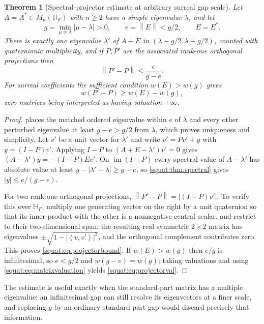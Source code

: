 \documentclass[11pt,letterpaper]{article}
\numberwithin{equation}{section}
\newtheorem{theorem}{Theorem}[section]
\theoremstyle{definition}
\theoremstyle{remark}
\newcommand{\HF}{\mathbb H_F}
\newcommand{\abs}[1]{\left|#1\right|}
\newcommand{\norm}[1]{\left\|#1\right\|}
\newcommand{\angles}[1]{\left\langle#1\right\rangle}
\begin{document}
\begin{theorem}[Spectral-projector estimate at arbitrary surreal gap scale]
\label{squat:thm:projector}
Let $A=A^*\in M_n(\HF)$ with $n\ge2$ have a simple eigenvalue $\lambda$, and let
\[
 g=\min_{\mu\ne\lambda}\abs{\mu-\lambda}>0,\qquad e=\norm E<g/2,\qquad E=E^* .
\]
There is exactly one eigenvalue $\lambda'$ of $A+E$ in $(\lambda-g/2,\lambda+g/2)$,
counted with quaternionic multiplicity, and if $P,P'$ are the associated rank-one
orthogonal projections then
\begin{equation}\label{squat:eq:projectorbound}
 \norm{P'-P}\le\frac{e}{g-e}.
\end{equation}
For surreal coefficients the sufficient condition $w(E)>w(g)$ gives
\begin{equation}\label{squat:eq:projectorval}
 w(P'-P)\ge w(E)-w(g),
\end{equation}
zero matrices being interpreted as having valuation $+\infty$.
\end{theorem}
\begin{proof}
 places the matched ordered eigenvalue within $e$ of $\lambda$ and
every other perturbed eigenvalue at least $g-e>g/2$ from $\lambda$, which proves
uniqueness and simplicity. Let $v'$ be a unit vector for $\lambda'$ and write
$v'=Pv'+y$ with $y=(I-P)v'$. Applying $I-P$ to $(A+E-\lambda')v'=0$ gives
$(A-\lambda')y=-(I-P)Ev'$. On $\operatorname{im}(I-P)$ every spectral value of
$A-\lambda'$ has absolute value at least $g-\abs{\lambda'-\lambda}\ge g-e$, so
\cref{squat:thm:spectral} gives $\abs y\le e/(g-e)$.

For two rank-one orthogonal projections, $\norm{P'-P}=\abs{(I-P)v'}$. To verify this over
$\HF$, multiply one generating vector on the right by a unit quaternion so that its inner
product with the other is a nonnegative central scalar, and restrict to their
two-dimensional span; the resulting real symmetric $2\times2$ matrix has eigenvalues
$\pm\sqrt{1-\abs{\angles{v,v'}}^2}$, and the orthogonal complement contributes zero. This
proves \cref{squat:eq:projectorbound}. If $w(E)>w(g)$ then $e/g$ is infinitesimal, so
$e<g/2$ and $w(g-e)=w(g)$; taking valuations and using
\cref{squat:eq:matrixvaluation} yields \cref{squat:eq:projectorval}.
\end{proof}

The estimate is useful exactly when the standard-part matrix has a multiple eigenvalue: an
infinitesimal gap can still resolve its eigenvectors at a finer scale, and replacing $g$ by
an ordinary standard-part gap would discard precisely that information.
\end{document}
